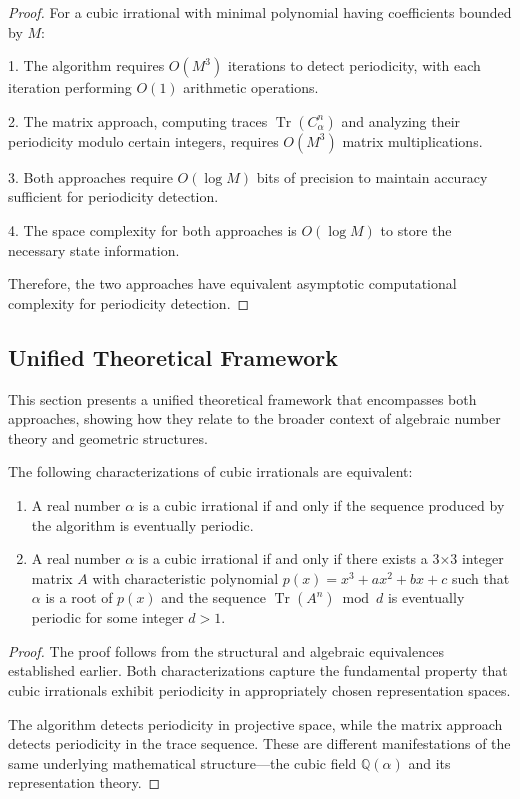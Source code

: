 \begin{proof}
For a cubic irrational with minimal polynomial having coefficients bounded by $M$:

1. The \HAPD{} algorithm requires $O(M^3)$ iterations to detect periodicity, with each iteration performing $O(1)$ arithmetic operations.

2. The matrix approach, computing traces $\operatorname{Tr}(C_\alpha^n)$ and analyzing their periodicity modulo certain integers, requires $O(M^3)$ matrix multiplications.

3. Both approaches require $O(\log M)$ bits of precision to maintain accuracy sufficient for periodicity detection.

4. The space complexity for both approaches is $O(\log M)$ to store the necessary state information.

Therefore, the two approaches have equivalent asymptotic computational complexity for periodicity detection.
\end{proof}

\subsection{Unified Theoretical Framework}

This section presents a unified theoretical framework that encompasses both approaches, showing how they relate to the broader context of algebraic number theory and geometric structures.

\begin{theorem}
The following characterizations of cubic irrationals are equivalent:
\begin{enumerate}
\item A real number $\alpha$ is a cubic irrational if and only if the sequence produced by the \HAPD{} algorithm is eventually periodic.
\item A real number $\alpha$ is a cubic irrational if and only if there exists a 3×3 integer matrix $A$ with characteristic polynomial $p(x) = x^3 + ax^2 + bx + c$ such that $\alpha$ is a root of $p(x)$ and the sequence $\operatorname{Tr}(A^n) \bmod d$ is eventually periodic for some integer $d > 1$.
\end{enumerate}
\end{theorem}

\begin{proof}
The proof follows from the structural and algebraic equivalences established earlier. Both characterizations capture the fundamental property that cubic irrationals exhibit periodicity in appropriately chosen representation spaces.

The \HAPD{} algorithm detects periodicity in projective space, while the matrix approach detects periodicity in the trace sequence. These are different manifestations of the same underlying mathematical structure—the cubic field $\mathbb{Q}(\alpha)$ and its representation theory.
\end{proof}

